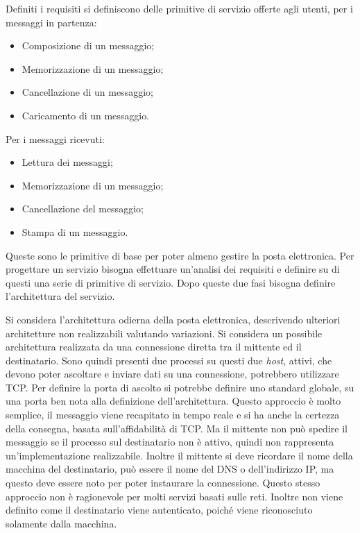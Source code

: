 \documentclass{article}
\numberwithin{equation}{subsection}
\begin{document}
Definiti i requisiti si definiscono delle primitive di servizio offerte agli utenti, per i messaggi in partenza:
\begin{itemize}
    \item Composizione di un messaggio;
    \item Memorizzazione di un messaggio;
    \item Cancellazione di un messaggio;
    \item Caricamento di un messaggio. 
\end{itemize}
Per i messaggi ricevuti:
\begin{itemize}
    \item Lettura dei messaggi;
    \item Memorizzazione di un messaggio;
    \item Cancellazione del messaggio;
    \item Stampa di un messaggio. 
\end{itemize}



Queste sono le primitive di base per poter almeno gestire la posta elettronica. 
Per progettare un servizio bisogna effettuare un'analisi dei requisiti e definire su di questi una serie di primitive di servizio. Dopo queste due fasi bisogna 
definire l'architettura del servizio. 


Si considera l'architettura odierna della posta elettronica, descrivendo ulteriori architetture non realizzabili valutando variazioni. Si considera un possibile architettura realizzata da una connessione diretta tra il mittente ed il destinatario. Sono quindi presenti due processi su questi due \textit{host}, attivi, che devono poter ascoltare e inviare dati su una connessione, potrebbero utilizzare \textcolor{Bittersweet}{TCP}. Per definire la porta di ascolto si potrebbe definire uno standard globale, su una porta ben nota alla definizione dell'architettura. 
Questo approccio è molto semplice, il messaggio viene recapitato in tempo reale e si ha anche la certezza della consegna, basata sull'affidabilità di \textcolor{Bittersweet}{TCP}. 
Ma il mittente non può spedire il messaggio se il processo sul destinatario non è attivo, quindi non rappresenta un'implementazione realizzabile. Inoltre il mittente si deve ricordare il nome della macchina del destinatario, può essere il nome del \textcolor{Mahogany}{DNS} o dell'indirizzo \textcolor{Bittersweet}{IP}, ma questo deve essere noto per poter instaurare la connessione. 
Questo stesso approccio non è ragionevole per molti servizi basati sulle reti. Inoltre non viene definito come il destinatario viene autenticato, poiché viene riconosciuto solamente dalla macchina. 
\end{document}
